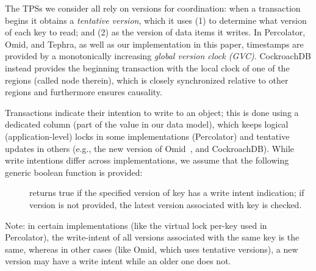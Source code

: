 The TPSs we consider all rely on versions for coordination: when a transaction begins it obtains a \emph{tentative version}, which 
it uses (1) to determine what version of each key to read; and (2) as the version of data items it writes.   
In Percolator, Omid, and Tephra, as well as our implementation in this paper, timestamps are provided by a monotonically
increasing \emph{global version  clock (GVC)}. CockroachDB instead provides the beginning transaction with the local clock of
one of the regions (called node therein), which is closely synchronized relative to other regions and furthermore ensures causality.

Transactions indicate their intention to write to an object; this is done using
a dedicated column (part of the value in our data model), which keeps logical
(application-level) locks in some implementations (Percolator) and tentative
updates in others (e.g., the new version of Omid~\cite{Omid-blog}, and CockroachDB). 
While write intentions differ across implementations, we assume that the following generic boolean function is  provided:
\begin{description}
\item[] returns true if the specified version of key has a write intent indication; if version is not provided, the 
latest version associated with key is checked.
\end{description}

Note: in certain implementations (like the virtual lock per-key used in Percolator), the write-intent of all versions associated 
with the same key is the same, whereas in other cases (like Omid, which uses tentative versions), a
new version may have a write intent while an older one does not.

